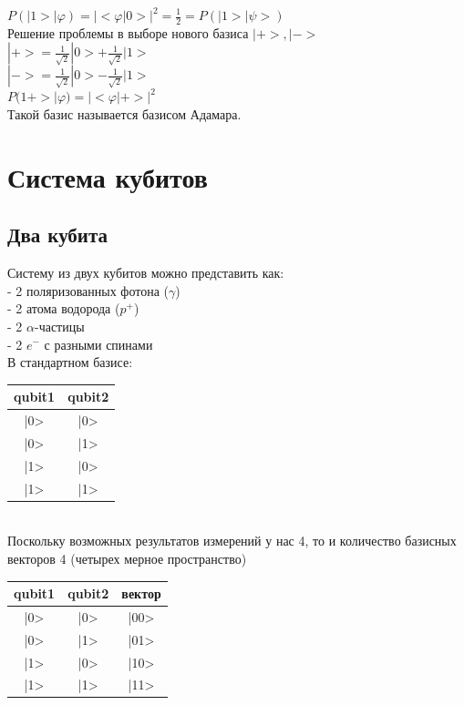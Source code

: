 \documentclass[11pt]{report}
\begin{document}
$P(|1>|\varphi) = |<\varphi|0>|^2 = \frac{1}{2} = P(|1>|\psi>)$\\

Решение проблемы в выборе нового базиса $|+>,|->$\\

$|+>=\frac{1}{\sqrt2}|0>+\frac{1}{\sqrt2}|1>$\\

$|->=\frac{1}{\sqrt2}|0>-\frac{1}{\sqrt2}|1>$\\

$P(1+>|\varphi)=|<\varphi|+>|^2$\\

Такой базис называется базисом Адамара.

\section{Система кубитов}
\subsection{Два кубита}
Систему из двух кубитов можно представить как: \\

- 2 поляризованных фотона ($\gamma$) \\

- 2 атома водорода ($p^+$) \\

- 2 $\alpha$-частицы \\

- 2 $e^-$ с разными спинами \\

В стандартном базисе:\\

\begin{tabular}{|c|c|}
\hline
	qubit1 & qubit2\\
\hline
	|0> & |0>\\
\hline
	|0> & |1>\\
\hline
	|1> & |0>\\
\hline
	|1> & |1>\\
\hline
\end{tabular}\\

Поскольку возможных результатов измерений у нас 4, то и количество базисных векторов 4 (четырех мерное пространство)\\

\begin{tabular}{|c|c|c|}
\hline
	qubit1 & qubit2 & вектор\\
\hline
	|0> & |0> & |00> \\
\hline
	|0> & |1> & |01> \\
\hline
	|1> & |0> & |10> \\
\hline
	|1> & |1> & |11> \\
\hline
\end{tabular} \\
\end{document}
